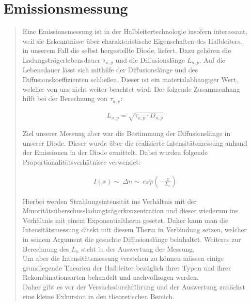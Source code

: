 \section{Emissionsmessung}
\begin{quote}

    Eine Emissionsmessung ist in der Halbleitertechnologie insofern interessant,
    weil sie Erkenntnisse über charakteristische Eigenschaften des Halbleiters,
    in unserem Fall die selbst hergestellte Diode, liefert. Dazu gehören die
    Ladungsträgerlebensdauer $\tau_{n,p}$ und die Diffusionslänge $L_{n,p}$. Auf
    die Lebensdauer lässt sich mithilfe der Diffusionslänge und des
    Diffusionskoeffizienten schließen. Dieser ist ein materialabhängiger Wert,
    welcher von uns nicht weiter beachtet wird. Der folgende Zusammenhang hilft
    bei der Berechnung von $\tau_{n,p}$:

    \begin{equation*}
        \begin{split}
            L_{n,p} = \sqrt{\tau_{n,p} \cdot D_{n,p}}
        \end{split}
    \end{equation*}

    Ziel unserer Messung aber war die Bestimmung der Diffusionslänge in unserer
    Diode. Dieser wurde über die realisierte Intensitätsmessung anhand der
    Emissionen in der Diode ermittelt. Dabei wurden folgende
    Proportionalitätsverhätnisse verwendet:

    \begin{equation*}
        \begin{split}
            I(x) \sim \ \Delta n \sim \ exp(-\frac{x}{L_n})
        \end{split}
    \end{equation*}

    Hierbei werden Strahlungsintensität ins Verhältnis mit der\\
    Minoritätsüberschussladungträgerkonzentration und dieser wiederum
    ins Verhältnis mit einem Exponentialtherm gesetzt. Daher kann man die
    Intensitätsmessung direkt mit diesem Therm in Verbindung setzen,
    welcher in seinem Argument die gesuchte Diffusionslänge beinhaltet. Weiteres
    zur Berechnung des $L_n$ steht in der Auswertung der Messung.\\

    Um aber die Intensitätsmessung verstehen zu können müssen einige
    grundlegende Theorien der Halbleiter bezüglich ihrer Typen und ihrer
    Rekombinationsarten behandelt und nachvollzogen werden.\\
    Daher gibt es vor der Versuchsdurchführung und der Auswertung zunächst eine
    kleine Exkursion in den theoretischen Bereich.


\end{quote}
